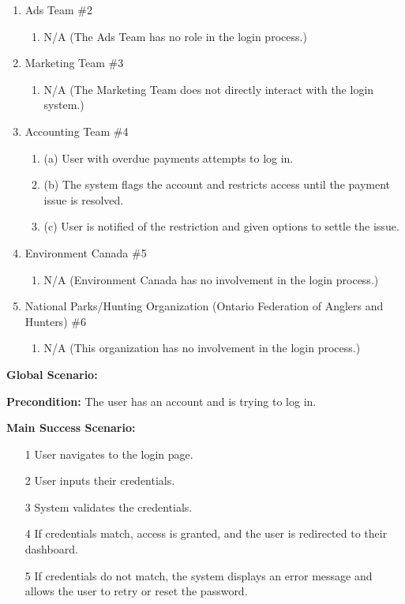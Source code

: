 \documentclass[]{article}
\begin{document}
\begin{enumerate}[{\bf BE1.}]
\begin{enumerate}[{\bf VP1.}]
    \item Ads Team \#2 \\
    \begin{enumerate}
        \item N/A (The Ads Team has no role in the login process.)
    \end{enumerate}

    \item Marketing Team \#3 \\
    \begin{enumerate}
        \item N/A (The Marketing Team does not directly interact with the login system.)
    \end{enumerate}

    \item Accounting Team \#4 \\
    \begin{enumerate}
        \item (a) User with overdue payments attempts to log in.
        \item (b) The system flags the account and restricts access until the payment issue is resolved.
        \item (c) User is notified of the restriction and given options to settle the issue.
    \end{enumerate}

    \item Environment Canada \#5 \\
    \begin{enumerate}
        \item N/A (Environment Canada has no involvement in the login process.)
    \end{enumerate}

    \item National Parks/Hunting Organization (Ontario Federation of Anglers and Hunters) \#6 \\
    \begin{enumerate}
        \item N/A (This organization has no involvement in the login process.)
    \end{enumerate}
\end{enumerate}

\textbf{Global Scenario:}

\textbf{Precondition:} The user has an account and is trying to log in.

\textbf{Main Success Scenario:}
\begin{enumerate}
    \item[1] User navigates to the login page.
    \item[2] User inputs their credentials.
    \item[3] System validates the credentials.
    \item[4] If credentials match, access is granted, and the user is redirected to their dashboard.
    \item[5] If credentials do not match, the system displays an error message and allows the user to retry or reset the password.
\end{enumerate}


\end{enumerate}
\end{document}
